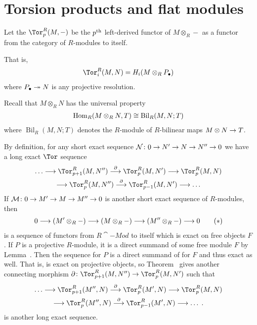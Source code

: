 \documentclass[a4paper,parskip=half,numbers=enddot, DIV=12]{scrreprt}
\begin{document}
\section{Torsion products and flat modules}
\begin{defi}
	Let the  $\Tor_p^R(M,-)$ be the $p^{\text{th}}$ left-derived functor of $M\otimes_R -$ as a functor from the category of $R$-modules to itself. 
\end{defi}
That is, 
\begin{align}\lbl{eq:TorDef}
	\Tor_i^R(M,N)=H_i(M\otimes_RP_\bullet)
\end{align}
where $P_\bullet \epimorphism N$ is any projective resolution.
\begin{rem*}
	\begin{alphanumerate}
		\item Recall that $M\otimes_RN$ has the universal property
		\begin{align*}
			\operatorname{Hom}_R(M\otimes_RN,T)\cong \operatorname{Bil}_R(M,N;T)
		\end{align*}
		where $\operatorname{Bil}_R(M,N;T)$ denotes the $R$-module of $R$-bilinear maps $M\otimes N\morphism T$.
		\item By definition, for any short exact sequence $\Nn\colon 0\morphism N'\morphism N\morphism N''\morphism 0$ we have a long exact $\Tor$ sequence 
		\begin{multline}\lbl{eq:TorSeq1}
			\ldots\morphism\Tor_{p+1}^R(M,N'')\morphism[\partial]\Tor_p^R(M,N')\morphism\Tor_p^R(M,N)\\
			\morphism\Tor_p^R(M,N'')\morphism[\partial]\Tor_{p-1}^R(M,N')\morphism\ldots
		\end{multline}		
		If $\Mm\colon 0\morphism M'\morphism M\morphism M''\morphism 0$ is another short exact sequence of $R$-modules, then
		\begin{align}\lbl{eq:TorFuncSeq}
			0\morphism (M'\otimes_R -)\morphism (M\otimes _R-)\morphism (M''\otimes_R-)\morphism 0\tag{$*$}
		\end{align}
		is a sequence of functors from $R\cat{-Mod}$ to itself which is exact on free objects $F$. If $P$ is a projective $R$-module, it is a direct summand of some free module $F$ by Lemma~. Then the sequence  for $P$ is a direct summand of  for $F$ and thus exact as well. That is,  is exact on projective objects, so Theorem~ gives another connecting morphism $\partial\colon \Tor_{p+1}^R(M,N'')\morphism\Tor_p^R(M,N')$ such that
		\begin{multline}\lbl{eq:TorSeq2}
			\ldots\morphism\Tor_{p+1}^R(M'',N)\morphism[\partial]\Tor_p^R(M',N)\morphism\Tor_p^R(M,N)\\
			\morphism\Tor_p^R(M'',N)\morphism[\partial]\Tor_{p-1}^R(M',N)\morphism\ldots\;.
		\end{multline}
		is another long exact sequence.
	\end{alphanumerate}
\end{rem*}
\end{document}
